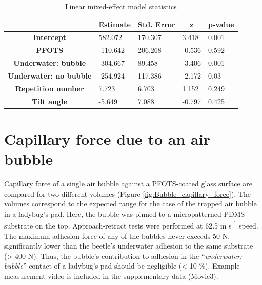 \documentclass[english]{achemso}
\begin{document}
\begin{table}[]
\begin{tabular}{|c|l|l|l|l|}
\hline
\multicolumn{1}{|l|}{}           & \multicolumn{1}{c|}{\textbf{Estimate}} & \multicolumn{1}{c|}{\textbf{Std. Error}} & \multicolumn{1}{c|}{\textbf{z}} & \multicolumn{1}{c|}{\textbf{p-value}} \\ \hline \hline
\textbf{Intercept \footnotemark[1]}               & 582.072                                & 170.307                                  & 3.418                           & 0.001                                 \\ \hline
\textbf{PFOTS}                   & -110.642                               & 206.268                                  & -0.536                          & 0.592                                 \\ \hline
\textbf{Underwater:   bubble}    & -304.667                               & 89.458                                   & -3.406                          & 0.001                                 \\ \hline
\textbf{Underwater: no   bubble} & -254.924                               & 117.386                                  & -2.172                          & 0.03                                  \\ \hline
\textbf{Repetition   number}     & 7.723                                  & 6.703                                    & 1.152                           & 0.249                                 \\ \hline
\textbf{Tilt angle}              & -5.649                                 & 7.088                                    & -0.797                          & 0.425                                 \\ \hline
\end{tabular}
\caption{Linear mixed-effect model statistics\label{tab:LMEM-analysis}}
\end{table}



\section{Capillary force due to an air bubble\label{subsec:Capillary-force-due}}


Capillary force of a single air bubble against a PFOTS-coated glass surface are compared
for two different volumes (Figure \ref{fig:Bubble_capillary_force}). The volumes correspond to the expected
range for the case of the trapped air bubble in a ladybug's pad. Here, the bubble
was pinned to a micropatterned PDMS substrate on the top. Approach-retract tests were performed
at 62.5 \textmu m s\protect\textsuperscript{-1} speed. The maximum
adhesion force of any of the bubbles never exceeds 50 \textmu N,
significantly lower than the beetle's underwater adhesion to the same
substrate (> 400 \textmu N). Thus, the bubble's contribution
to adhesion in the ``\emph{underwater: bubble}'' contact of a ladybug's
pad should be negligible (< 10 \%). Example measurement video is included in the supplementary data (Movie3).
\end{document}
